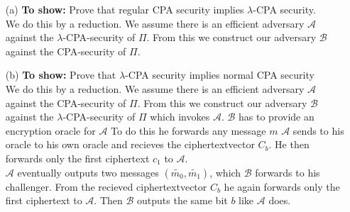 \begin{itemize}
\item [(a)]
	\textbf{To show:} Prove that regular CPA security implies \(\lambda\)-CPA security.\\
	We do this by a reduction. We assume there is an efficient adversary \(\mathcal{A}\) against the \(\lambda\)-CPA-security of \(\Pi\). From this we construct our adversary \(\mathcal{B}\) against the CPA-security of \(\Pi\).
\item [(b)]
	\textbf{To show:} Prove that \(\lambda\)-CPA security implies normal CPA security\\
	We do this by a reduction. We assume there is an efficient adversary \(\mathcal{A}\) against the CPA-security of \(\Pi\). From this we construct our adversary \(\mathcal{B}\) against the \(\lambda\)-CPA-security of \(\Pi\) which invokes \(\mathcal{A}\). \(\mathcal{B}\) has to provide an encryption oracle for \(\mathcal{A}\) To do this he forwards any message \(m\) \(\mathcal{A}\) sends to his oracle to his own oracle and recieves the ciphertextvector \(C_b\). He then forwards only the first ciphertext \(c_1\) to \(\mathcal{A}\). \\
	\(\mathcal{A}\) eventually outputs two messages \((\widetilde{m_0}, \widetilde{m_1})\), which \(\mathcal{B}\) forwards to his challenger. From the recieved ciphertextvector \(C_b\) he again forwards only the first ciphertext to \(\mathcal{A}\). Then \(\mathcal{B}\) outputs the same bit \(b\) like \(\mathcal{A}\) does. 
\end{itemize}

